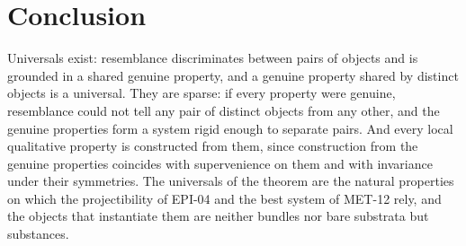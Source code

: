 \documentclass{situationist-preprint}
\begin{document}
\section{Conclusion}

Universals exist: resemblance discriminates between pairs of objects and is grounded in a shared genuine property, and a genuine property shared by distinct objects is a universal. They are sparse: if every property were genuine, resemblance could not tell any pair of distinct objects from any other, and the genuine properties form a system rigid enough to separate pairs. And every local qualitative property is constructed from them, since construction from the genuine properties coincides with supervenience on them and with invariance under their symmetries. The universals of the theorem are the natural properties on which the projectibility of EPI-04 and the best system of MET-12 rely, and the objects that instantiate them are neither bundles nor bare substrata but substances.
\end{document}
